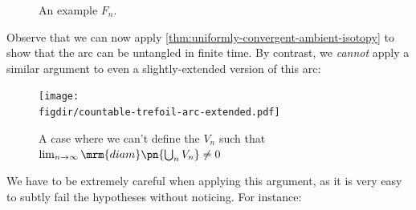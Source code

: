 \begin{example}
\begin{figure}[H]
    \caption{An example $F_n$.}
  \end{figure}
  Observe that we can now apply
  \cref{thm:uniformly-convergent-ambient-isotopy} to show that the arc
  can be untangled in finite time. By contrast, we \emph{cannot} apply
  a similar argument to even a slightly-extended version of this arc:
  \begin{figure}[H]
    \centering
    \texttt{[image: \\figdir/countable-trefoil-arc-extended.pdf]}
    \caption[A non-example]{A case where we can't define the $V_n$
      such that $\lim_{n\to\infty} \mrm{diam}\pn{\bigcup_n V_n} \neq
      0$}
  \end{figure}
\end{example}
We have to be extremely careful when applying this argument, as it is
very easy to subtly fail the hypotheses without noticing. For
instance:
